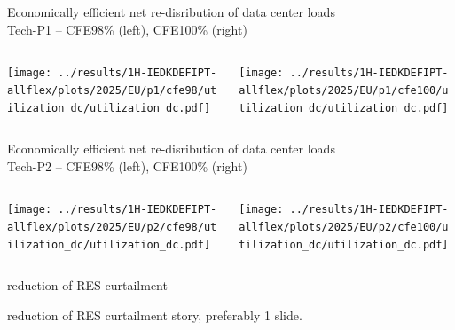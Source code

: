 
\begin{frame}{Economically efficient net re-disribution of data center loads \\
  Tech-P1 -- CFE98\% (left), CFE100\% (right)}

  \begin{columns}[T]
  \begin{column}{6cm}
    \centering
    \texttt{[image: ../results/1H-IEDKDEFIPT-allflex/plots/2025/EU/p1/cfe98/utilization\_dc/utilization\_dc.pdf]}
  \end{column}

  \begin{column}{6cm}
    \centering
    \texttt{[image: ../results/1H-IEDKDEFIPT-allflex/plots/2025/EU/p1/cfe100/utilization\_dc/utilization\_dc.pdf]}  
  \end{column}
  \end{columns}

\end{frame}


\begin{frame}{Economically efficient net re-disribution of data center loads \\
  Tech-P2 -- CFE98\% (left), CFE100\% (right)}

  \begin{columns}[T]
  \begin{column}{6cm}
    \centering
    \texttt{[image: ../results/1H-IEDKDEFIPT-allflex/plots/2025/EU/p2/cfe98/utilization\_dc/utilization\_dc.pdf]}
  \end{column}

  \begin{column}{6cm}
    \centering
    \texttt{[image: ../results/1H-IEDKDEFIPT-allflex/plots/2025/EU/p2/cfe100/utilization\_dc/utilization\_dc.pdf]}  
  \end{column}
  \end{columns}

\end{frame}



\begin{frame}{reduction of RES curtailment}

  {\footnotesize
  \vspace{0.2cm}

  reduction of RES curtailment story, preferably 1 slide.


  }
\end{frame}


